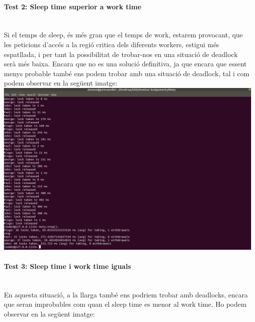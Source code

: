 \documentclass[a4paper, 10pt]{article}
\begin{document}
\begin{enumerate}
\newpage\paragraph[bold]{Test 2: Sleep time superior a work time\\\\}
Si el temps de sleep, és més gran que el temps de work, estarem provocant, que les peticions d’accés a la regió critica dels diferents workers, estigui més espatllada, i per tant la possibilitat de trobar-nos en una situació de deadlock serà més baixa. Encara que no es una solució definitiva, ja que encara que essent menys probable també ens podem trobar amb una situació de deadlock, tal i com podem observar en la següent imatge:\\

\includegraphics[width=\textwidth]{test-3}
\newpage
\paragraph[bold]{Test 3: Sleep time i work time iguals\\\\}

En aquesta situació, a la llarga també ens podriem trobar amb deadlocks, encara que  seran improbables com quan el sleep time es menor al work time. Ho podem observar en la següent imatge:\\


\end{enumerate}
\end{document}
